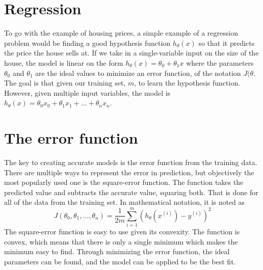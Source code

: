 \documentclass[a4paper,12pt]{article}
\begin{document}
\section{Regression}
To go with the example of housing prices, a simple example of a regression problem would be finding a good hypothesis function \(h_\theta(x)\) so that it predicts the price the house sells at. If we take in a single-variable input on the size of the house, the model is linear on the form  \(h_\theta(x) = \theta_0 + \theta_1x\) where the parameters \(\theta_0\) and \(\theta_1\) are the ideal values to minimize an error function, of the notation \(J(\theta\). The goal is that given our training set, \(m\), to learn the hypothesis function. However, given multiple input variables, the model is \(h_\theta(x) = \theta_0x_0 + \theta_1x_1 + ... + \theta_nx_n\).

\section{The error function}
The key to creating accurate models is the error function from the training data. There are multiple ways to represent the error in prediction, but objectively the most popularly used one is the square-error function. The function takes the predicted value and subtracts the accurate value, squaring both. That is done for all of the data from the training set. In mathematical notation, it is noted as
\[J(\theta_0, \theta_1, ..., \theta_n) = \frac{1}{2m} \sum_{i=1}^m (h_\theta(x^{(i)}) - y^{(i)})^2\]
The square-error function is easy to use given its convexity. The function is convex, which means that there is only a single minimum which makes the minimum easy to find. Through minimizing the error function, the ideal parameters can be found, and the model can be applied to be the best fit.
\end{document}
